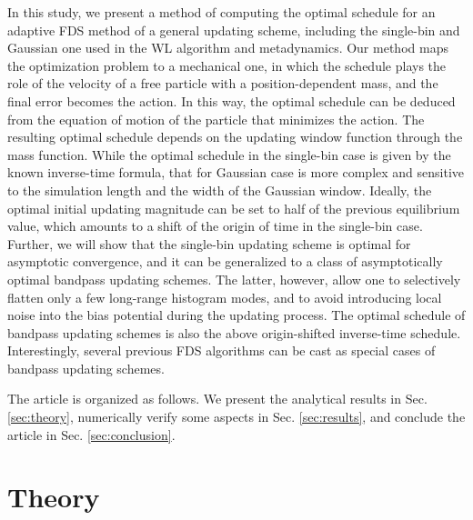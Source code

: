 \documentclass[reprint, superscriptaddress, floatfix]{revtex4-1}
\begin{document}
In this study,
we present a method of computing
the optimal schedule
for an adaptive FDS method
of a general updating scheme,
including the single-bin and Gaussian one
used in the WL algorithm and metadynamics.
%
Our method maps the optimization problem to a mechanical one,
in which the schedule plays the role of the velocity of
a free particle with a position-dependent mass,
and the final error becomes the action.
%
In this way, the optimal schedule
can be deduced from the equation of motion
of the particle that minimizes the action.
%
The resulting optimal schedule
depends on the updating window function
through the mass function.
%
While the optimal schedule in the single-bin case
is given by the known inverse-time formula,
that for Gaussian case is more complex
and sensitive to the simulation length
and the width of the Gaussian window.
%
Ideally,
the optimal initial updating magnitude
can be set to
half of the previous equilibrium value,
which amounts to a shift of the origin of time
in the single-bin case.
%
Further, we will show that
the single-bin updating scheme
is optimal for asymptotic convergence,
and it can be generalized
to a class of asymptotically optimal
bandpass updating schemes.
%
The latter, however,
allow one to selectively flatten only
a few long-range histogram modes,
and to avoid introducing local noise
into the bias potential during the updating process.
%
The optimal schedule of bandpass updating schemes
is also the above origin-shifted inverse-time schedule.
%
Interestingly, several previous FDS algorithms\cite{
  langfeld2012, pellegrini2014,
  neuhaus2006, *neuhaus2007}
can be cast as special cases of bandpass updating schemes.
  
%



The article is organized as follows.
%
We present the analytical results in Sec. \ref{sec:theory},
numerically verify some aspects
in Sec. \ref{sec:results},
and conclude the article
in Sec. \ref{sec:conclusion}.




\section{\label{sec:theory}
Theory}
\end{document}
